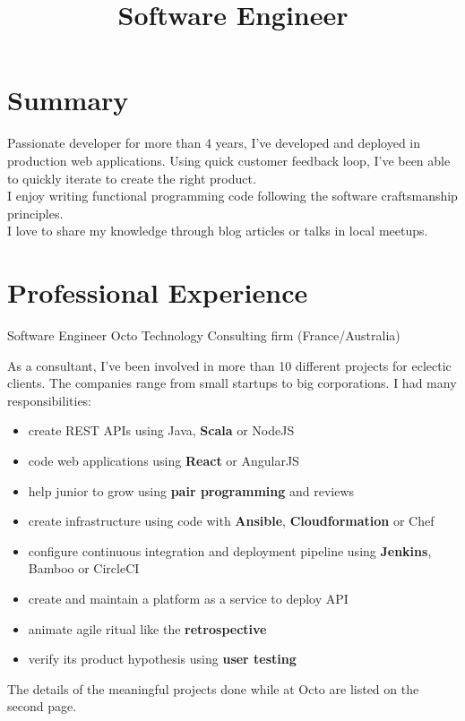 \documentclass[11pt,a4paper]{moderncv}
\title{Software Engineer}
\begin{document}
\maketitle
\vspace{-10mm}
\section{Summary}
Passionate developer for more than 4 years, I've developed and deployed in production web applications. Using quick customer feedback loop, I've been able to quickly iterate to create the right product. 
\\
I enjoy writing functional programming code following the software craftsmanship principles.
\\
I love to share my knowledge through blog articles or talks in local meetups.

\section{Professional Experience}

{Software Engineer}
{Octo Technology}
{Consulting firm}
{(France/Australia)}
{
As a consultant, I've been involved in more than 10 different projects for eclectic clients. The companies range from small startups to big corporations. I had many responsibilities:
\begin{itemize}
\item create REST APIs using Java, \textbf{Scala} or NodeJS
\item code web applications using \textbf{React} or AngularJS
\item help junior to grow using \textbf{pair programming} and reviews
\item create infrastructure using code with \textbf{Ansible}, \textbf{Cloudformation} or Chef
\item configure continuous integration and deployment pipeline using \textbf{Jenkins}, Bamboo or CircleCI
\item create and maintain a platform as a service to deploy API
\item animate agile ritual like the \textbf{retrospective}
\item verify its product hypothesis using \textbf{user testing}
\end{itemize}
The details of the meaningful projects done while at Octo are listed on the second page.
}
\end{document}
